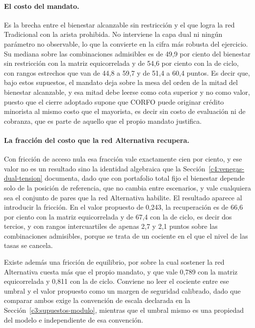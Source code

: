 \paragraph{El costo del mandato.} Es la brecha entre el bienestar alcanzable sin restricción y el que logra la red Tradicional con la arista prohibida. No interviene la capa dual ni ningún parámetro no observable, lo que la convierte en la cifra más robusta del ejercicio. Su mediana sobre las combinaciones admisibles es de 49,9 por ciento del bienestar sin restricción con la matriz equicorrelada y de 54,6 por ciento con la de ciclo, con rangos estrechos que van de 44,8 a 59,7 y de 51,4 a 60,4 puntos. Es decir que, bajo estos supuestos, el mandato deja sobre la mesa del orden de la mitad del bienestar alcanzable, y esa mitad debe leerse como cota superior y no como valor, puesto que el cierre adoptado supone que CORFO puede originar crédito minorista al mismo costo que el mayorista, es decir sin costo de evaluación ni de cobranza, que es parte de aquello que el propio mandato justifica.

\paragraph{La fracción del costo que la red Alternativa recupera.} Con fricción de acceso nula esa fracción vale exactamente cien por ciento, y ese valor no es un resultado sino la identidad algebraica que la Sección~\ref{c4:venegas-dual-tension} documenta, dado que con portafolio total fijo el bienestar depende solo de la posición de referencia, que no cambia entre escenarios, y vale cualquiera sea el conjunto de pares que la red Alternativa habilite. El resultado aparece al introducir la fricción. En el valor propuesto de 0,243, la recuperación es de 66,6 por ciento con la matriz equicorrelada y de 67,4 con la de ciclo, es decir dos tercios, y con rangos intercuartiles de apenas 2,7 y 2,1 puntos sobre las combinaciones admisibles, porque se trata de un cociente en el que el nivel de las tasas se cancela.

Existe además una fricción de equilibrio, por sobre la cual sostener la red Alternativa cuesta más que el propio mandato, y que vale 0,789 con la matriz equicorrelada y 0,811 con la de ciclo. Conviene no leer el cociente entre ese umbral y el valor propuesto como un margen de seguridad calibrado, dado que comparar ambos exige la convención de escala declarada en la Sección~\ref{c3:supuestos-modulo}, mientras que el umbral mismo es una propiedad del modelo e independiente de esa convención.

